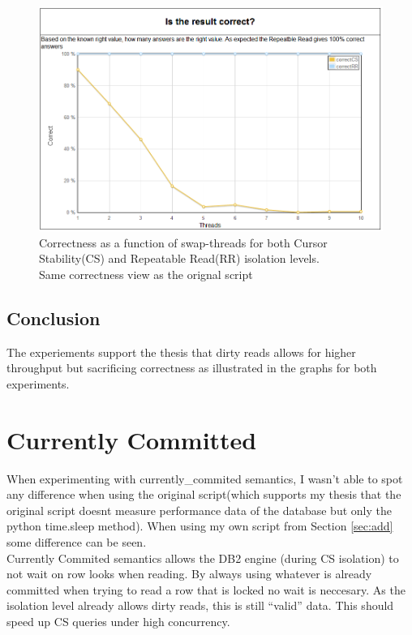 \begin{figure}
  \centering
  \includegraphics[width=12cm]{assignment1/curon_corr}
  \caption[Correctness - new script]{Correctness as a function of
  swap-threads for both Cursor Stability(CS) and Repeatable Read(RR) isolation
  levels.\\ Same correctness view as the orignal script }\label{fig:curoncorr}
\end{figure}

\section{Conclusion}
The experiements support the thesis that dirty reads allows for higher
throughput but sacrificing correctness as illustrated in the graphs for both
experiments.


\chapter{Currently Committed}\label{sec:curcommit}
When experimenting with currently\_commited semantics, I wasn't able to spot any
difference when using the original script(which supports my thesis that the
original script doesnt measure performance data of the database but only the
python time.sleep method). When using my own script from Section
\ref{sec:add} some difference can be seen. \\

Currently Commited semantics allows the DB2 engine (during CS isolation) to not
wait on row looks when reading. By always using whatever is already committed
when trying to read a row that is locked no wait is neccesary. As the
isolation level already allows dirty reads, this is still ``valid'' data. This
should speed up CS queries under high concurrency.

